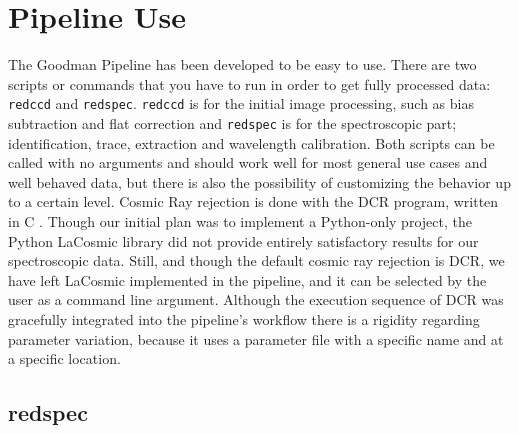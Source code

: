 \documentclass[11pt,twoside]{article}
\begin{document}
\section{Pipeline Use}
The Goodman Pipeline has been developed to be easy to use. There are two scripts
or commands that you have to run in order to get fully processed data:
\verb=redccd= and \verb=redspec=.
\verb=redccd= is for the initial image processing, such as bias
subtraction and flat correction and \verb=redspec= is for the spectroscopic
part; identification, trace, extraction and wavelength calibration.
Both scripts can be called with no arguments and should work well for most general use cases
and well behaved data, but there is also the possibility of customizing the behavior
up to a certain level. Cosmic Ray rejection is done with the DCR program,
written in C \citep{2004PASP..116..148P}. Though our initial plan was to
implement a Python-only project, the Python LaCosmic library \citep{2001PASP..113.1420V}
did not provide entirely satisfactory results for our spectroscopic data. Still,
and though the default cosmic ray rejection is DCR, we have left LaCosmic
implemented in the pipeline, and it can be selected by the user as a command line argument.
Although the execution sequence of DCR
was gracefully integrated into the pipeline's workflow there is a rigidity
regarding parameter variation, because it uses a parameter file with a specific
name and at a specific location.


\subsection{redspec}
\end{document}
